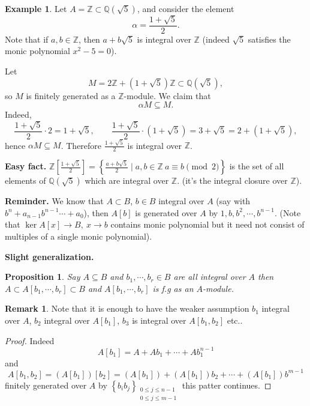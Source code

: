 \documentclass[11pt,a4paper]{article}
\theoremstyle{definition}
\newtheorem{example}[definition]{Example}
\newtheorem{remark}[definition]{Remark}
\theoremstyle{plain}
\newtheorem{proposition}[definition]{Proposition}
\theoremstyle{remark}
\newcommand{\Z}{\mathbb{Z}}
\newcommand{\Q}{\mathbb{Q}}
\renewcommand{\set}[1]{\left\{ #1 \right\}}
\begin{document}
\begin{example}
    Let $A = \Z \subset \Q(\sqrt{5})$, and consider the element
    \[
    \alpha = \frac{1 + \sqrt{5}}{2}.
    \]
    Note that if $a,b \in \Z$, then $a + b\sqrt{5}$ is integral over $\Z$
    (indeed $\sqrt{5}$ satisfies the monic polynomial $x^2 - 5 = 0$).
    
    Let
    \[
    M = 2\Z + (1 + \sqrt{5})\Z \subset \Q(\sqrt{5}),
    \]
    so $M$ is finitely generated as a $\Z$-module. We claim that
    \[
    \alpha M \subseteq M.
    \]
    Indeed,
    \[
    \frac{1+\sqrt{5}}{2} \cdot 2 = 1 + \sqrt{5}, 
    \qquad
    \frac{1 + \sqrt{5}}{2} \cdot (1 + \sqrt{5})
    = 3 + \sqrt{5}
    = 2 + (1 + \sqrt{5}),
    \]
    hence $\alpha M \subseteq M$. Therefore
    $\frac{1 + \sqrt{5}}{2}$ is integral over $\Z$.
\end{example}

\textbf{Easy fact.} $\Z[\frac{1 + \sqrt{5}}{2}] = \set{\frac{a + b \sqrt{5}}{2} \mid a, b \in \Z \ a \equiv b \pmod 2}$ is the 
set of all elements of $\Q(\sqrt{5})$ which are integral over $\Z$. (it's the integral closure over $\Z$). 

\textbf{Reminder.} We know that $A \subset B$, $b \in B$ integral over $A$ (say with $b^n + a_{n-1} b^{n-1} \cdots + a_0$), then $A[b]$ is generated over $A$ by 
$1, b, b^2, \cdots, b^{n-1}$. (Note that $\ker A[x] \to B, \ x \to b$ contains monic polynomial but it need not consist of multiples of a single monic polynomial). 

\textbf{Slight generalization.} 
\begin{proposition}
    Say $A \subseteq B$ and $b_1, \cdots, b_r \in B$ are all integral over $A$ 
    then $A \subset A[b_1, \cdots, b_r] \subset B$ and 
    $A[b_1, \cdots, b_r]$ is f.g as an $A$-module.  
\end{proposition}

\begin{remark}
    Note that it is enough to have the weaker assumption $b_1$ integral over $A$, $b_2$ integral over $A[b_1]$, $b_3$ is integral over $A[b_1,b_2]$ etc..
\end{remark}

\begin{proof}
    Indeed 
    $$A[b_1] = A + A b_1 + \cdots + A b_1^{n-1}$$
    and 
    $$A[b_1, b_2] = (A[b_1]) [b_2] = (A[b_1]) + (A[b_1]) b_2 + \cdots + (A[b_1])b^{m-1}$$
    finitely generated over $A$ by $\set{b_ib_j}_{\substack{0 \le j \le n-1 \\ 0 \le j \le m-1}}$ this patter continues. 
\end{proof}
\end{document}
